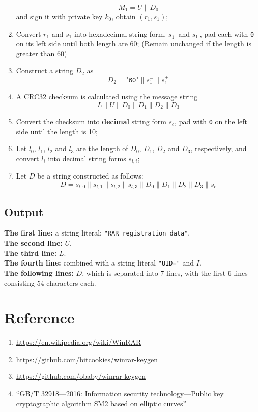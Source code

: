 \documentclass[oneside]{article}
\begin{document}
\begin{enumerate}
            \[M_1=U\parallel D_0\]
            and sign it with private key $k_0$, obtain $\left(r_1,s_1\right)$;
      \item Convert $r_1$ and $s_1$ into hexadecimal string form, $s_1^+$ and $s_1^-$, pad each with \texttt{0} on its left side until both length are 60; (Remain unchanged if the length is greater than 60)
      \item Construct a string $D_2$ as
            \[D_2=\texttt{"60"}\parallel s_1^-\parallel s_1^+\]
      \item A CRC32 checksum is calculated using the message string
            \[L\parallel U\parallel D_0\parallel D_1\parallel D_2\parallel D_3\]
      \item Convert the checksum into \textbf{decimal} string form $s_c$, pad with \texttt{0} on the left side until the length is 10;
      \item Let $l_0$, $l_1$, $l_2$ and $l_3$ are the length of $D_0$, $D_1$, $D_2$ and $D_3$, respectively, and convert $l_i$ into decimal string forms $s_{l,i}$;
      \item Let $D$ be a string constructed as follows:
            \[D=s_{l,0}\parallel s_{l,1}\parallel s_{l,2}\parallel s_{l,3}\parallel D_0\parallel D_1\parallel D_2\parallel D_3 \parallel s_c\]
\end{enumerate}

\subsection{Output}
\textbf{The first line:} a string literal: \texttt{"RAR registration data"}.\\
\textbf{The second line:} $U$.\\
\textbf{The third line:} $L$.\\
\textbf{The fourth line:} combined with a string literal \texttt{"UID="} and $I$.\\
\textbf{The following lines:} $D$, which is separated into 7 lines, with the first 6 lines consisting 54 characters each.

\section*{Reference}
\begin{enumerate}
      \item \url{https://en.wikipedia.org/wiki/WinRAR}
      \item \url{https://github.com/bitcookies/winrar-keygen}
      \item \url{https://github.com/obaby/winrar-keygen}
      \item ``GB/T 32918—2016: Information security technology—Public key cryptographic algorithm SM2 based on elliptic curves''
\end{enumerate}
\end{document}
